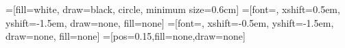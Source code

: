 \documentclass[tikz,border=10pt]{standalone}
\begin{document}
    =[fill=white, draw=black, circle, minimum size=0.6cm]
    =[font=\scriptsize, xshift=0.5em, yshift=-1.5em, draw=none, fill=none]
    =[font=\scriptsize, xshift=-0.5em, yshift=-1.5em, draw=none, fill=none]
    =[pos=0.15,fill=none,draw=none]
    
    
\end{document}

